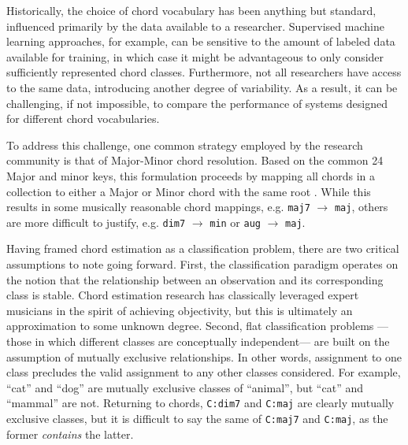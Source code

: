 Historically, the choice of chord vocabulary has been anything but standard, influenced primarily by the data available to a researcher.
Supervised machine learning approaches, for example, can be sensitive to the amount of labeled data available for training, in which case it might be advantageous to only consider sufficiently represented chord classes.
Furthermore, not all researchers have access to the same data, introducing another degree of variability.
As a result, it can be challenging, if not impossible, to compare the performance of systems designed for different chord vocabularies.

To address this challenge, one common strategy employed by the research community is that of Major-Minor chord resolution.
Based on the common 24 Major and minor keys, this formulation proceeds by mapping all chords in a collection to either a Major or Minor chord with the same root \cite{McVicar2013Machine}.
While this results in some musically reasonable chord mappings, e.g. \texttt{maj7} $\to$ \texttt{maj}, others are more difficult to justify, e.g. \texttt{dim7} $\to$ \texttt{min} or \texttt{aug} $\to$ \texttt{maj}.

Having framed chord estimation as a classification problem, there are two critical assumptions to note going forward.
First, the classification paradigm operates on the notion that the relationship between an observation and its corresponding class is stable.
Chord estimation research has classically leveraged expert musicians in the spirit of achieving objectivity, but this is ultimately an approximation to some unknown degree.
Second, flat classification problems ---those in which different classes are conceptually independent--- are built on the assumption of mutually exclusive relationships.
In other words, assignment to one class precludes the valid assignment to any other classes considered.
For example, ``cat'' and ``dog'' are mutually exclusive classes of ``animal'', but ``cat'' and ``mammal'' are not.
Returning to chords, \texttt{C:dim7} and \texttt{C:maj} are clearly mutually exclusive classes, but it is difficult to say the same of \texttt{C:maj7} and \texttt{C:maj}, as the former \emph{contains} the latter.


